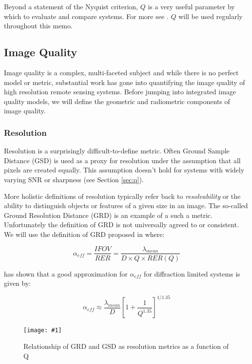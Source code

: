 \documentclass[10pt,journal]{IEEEtran}  %
\newcommand{\includepgf}[3]
{
  \begin{figure}[h!]
  \centering
  \texttt{[image: \#1]}
  \caption[]{#3}
  \label{#2}
  \end{figure}
}
\begin{document}
Beyond a statement of the Nyquist criterion, $Q$ is a very useful parameter by which to evaluate and compare systems.  For more see \cite{fiete_q}.  $Q$ will be used regularly throughout this memo.

\subsection{Image Quality}
\label{sec:iq}

Image quality is a complex, multi-faceted subject and while there is no perfect model or metric, substantial work has gone into quantifying the image quality of high resolution remote sensing systems.  Before jumping into integrated image quality models, we will define the geometric and radiometric components of image quality.

\subsubsection{Resolution}
Resolution is a surprisingly difficult-to-define metric.  Often Ground Sample Distance (GSD) is used as a proxy for resolution under the assumption that all pixels are created equally.  This assumption doesn't hold for systems with widely varying SNR or sharpness (see Section \ref{sec:q}).

More holistic definitions of resolution typically refer back to \emph{resolvability} or the ability to distinguish objects or features of a given size in an image.  The so-called Ground Resolution Distance (GRD) is an example of a such a metric.  Unfortunately the definition of GRD is not universally agreed to or consistent.  We will use the definition of GRD proposed in \cite{auelmann_iq} where:

\begin{equation}
    \alpha_{eff} = \frac{IFOV}{RER} = \frac{\lambda_{mean}}{D\times Q \times RER (Q)}
\label{eq:alpha_eff}
\end{equation}

\cite{auelmann_iq} has shown that a good approximation for $\alpha_{eff}$ for diffraction limited systems is given by:


\begin{equation}
    \alpha_{eff} \approx \frac{\lambda_{mean}}{D}\left[1 + \frac{1}{Q^{1.35}}\right]^{1/1.35}
\label{eq:alpha_eff_approx}
\end{equation}

\includepgf{figures/resolution_q.pgf}{fig:resolution_q}{Relationship of GRD and GSD as resolution metrics as a function of Q}
\end{document}

